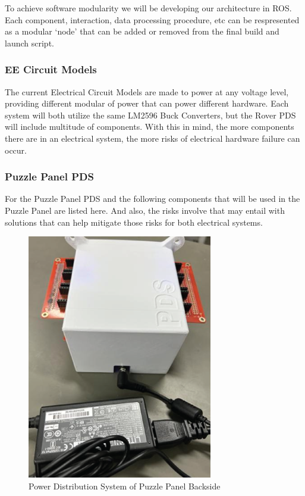 \documentclass[a4paper, 10pt]{article}
\begin{document}
 	To achieve software modularity we will be developing our architecture in ROS. Each component, interaction, data processing procedure, etc can be respresented as a modular `node' that can be added or removed from the final build and launch script.
 		
 		\subsubsection{EE Circuit Models}
 		The current Electrical Circuit Models are made to power at any voltage level, providing different modular of power that can power different hardware. Each system will both utilize the same LM2596 Buck Converters, but the Rover PDS will include multitude of components. With this in mind, the more components there are in an electrical system, the more risks of electrical hardware failure can occur. 
 		
 		\subsubsection*{Puzzle Panel PDS}
		For the Puzzle Panel PDS and the following components that will be used in the Puzzle Panel are listed here. And also, the risks involve that may entail with solutions that can help mitigate those risks for both electrical systems. 

		\begin{figure} [h]
			\centering
			\includegraphics[scale=0.75]{Photos/Puzzle Panel PDS backside}
			\caption{Power Distribution System of Puzzle Panel Backside}
		\end{figure}
		
\end{document}
